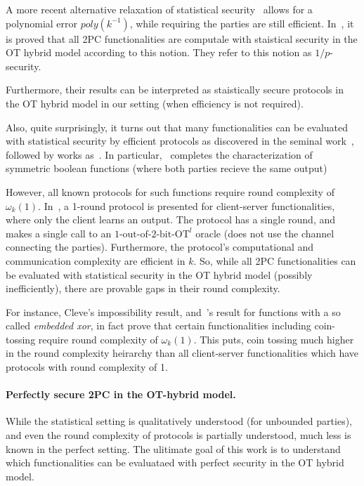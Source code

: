 \documentclass[a4paper]{article}
\newcommand{\OT}[2]{#1\text{-out-of-}#2\text{-bit-OT}}
\begin{document}
A more recent alternative relaxation of statistical security~\cite{GK10}
allows for a polynomial error $poly(k^{-1})$, while requiring the parties are still efficient. In~\cite{GK10}, it is proved that all 2PC functionalities are computale with staistical security in the OT hybrid model according to this notion. They refer to this notion as $1/p$-security.

Furthermore, their results can be interpreted as staistically secure protocols in the OT hybrid model in our setting (when efficiency is not required).%

Also, quite surprisingly, it turns out that many functionalities can be evaluated with statistical security by efficient protocols as discovered in the seminal work~\cite{GHKL08}, followed by works as~\cite{Ash14,ABMO15}. In particular,~\cite{ABMO15} completes the characterization of symmetric boolean functions
(where both parties recieve the same output)
 
However, all known protocols for such functions require round complexity of $\omega_k(1)$. In~\cite{IKOPS11}, a 1-round protocol is presented for client-server functionalities, where only the client learns an output. The protocol has a single round, and makes a single call to an  ${\OT{1}{2}}^l$ oracle (does not use the channel connecting the parties).
Furthermore, the protocol's computational and communication complexity are efficient in $k$. So, while all 2PC functionalities can be evaluated with statistical security in the OT hybrid model (possibly inefficiently), there are provable gaps in their round complexity. 

For instance, Cleve's impossibility result, and~\cite{GHKL08}'s result for functions with a so called \emph{embedded xor}, in fact prove that certain functionalities including coin-tossing require round complexity of $\omega_k(1)$. This puts, coin tossing much higher in the round complexity heirarchy than all client-server functionalities which have protocols with round complexity of 1.

\paragraph{Perfectly secure 2PC in the OT-hybrid model.}
While the statistical setting is qualitatively understood (for unbounded parties), and even the round complexity of protocols is partially understood, much less is known in the perfect setting. 
The ulitimate goal of this work is to understand which functionalities can be evaluataed with perfect security in the OT hybrid model.
\end{document}
